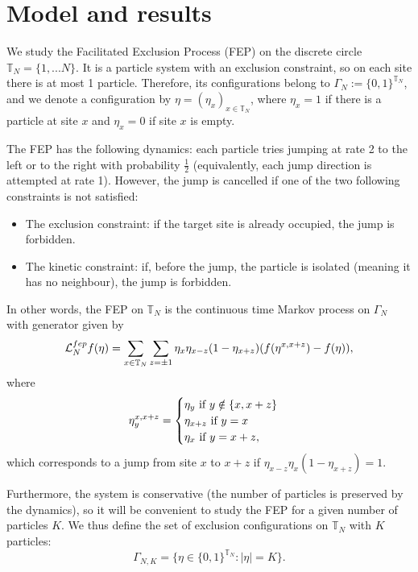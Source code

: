 \documentclass[11pt,a4paper]{article}
\newcommand{\T}{\mathbb{T}}
\newcommand{\FEP}{\textsc{fep}}
\newcommand{\eqs}[1]{\begin{equation}#1\end{equation}}
\newcommand{\eq}[2]{\begin{equation}\label{#1}#2\end{equation}}
\begin{document}
\section{Model and results}
We study the Facilitated Exclusion Process (FEP) on the discrete circle $\T_N = \{1,... N\}$. It is a particle system with an exclusion constraint, so on each site there is at most 1 particle. Therefore, its configurations belong to $\Gamma_N := \{0,1\}^{\T_N}$, and we denote a configuration by $\eta = (\eta_x)_{x \in \T_N}$, where $\eta_x = 1$ if there is a particle at site $x$ and $\eta_x=0$ if site $x$ is empty. 

The FEP has the following dynamics: each particle tries jumping at rate 2 to the left or to the right with probability $\frac12$ (equivalently, each jump direction is attempted at rate 1). However, the jump is cancelled if one of the two following constraints is not satisfied:
\begin{itemize}
\item The exclusion constraint: if the target site is already occupied, the jump is forbidden.
\item The kinetic constraint: if, before the jump, the particle is isolated (meaning it has no neighbour), the jump is forbidden.
\end{itemize}

In other words, the FEP on $\T_N$ is the continuous time Markov process on $\Gamma_{N}$ with generator given by
\eqs{\mathcal{L}_N^{\FEP}f(\eta) = \sum_{x \in \T_N}\sum_{z = \pm 1}\eta_x \eta_{x-z} (1 - \eta_{x+z}) (f(\eta^{x,x+z}) - f(\eta)),}
where
\begin{equation} \label{eq:swap-fep}
\eta_y^{x,x+z} =
    \begin{cases}
        \eta_y \hbox{ if } y \notin \{x,x+z\}\\
        \eta_{x+z} \hbox{ if } y=x \\
        \eta_x \hbox{ if } y = x+z,
    \end{cases}       
    \end{equation}
which corresponds to a jump from site $x$ to $x+z$ if $\eta_{x-z}\eta_x(1-\eta_{x+z})=1$. 

Furthermore, the system is conservative (the number of particles is preserved by the dynamics), so it will be convenient to study the FEP for a given number of particles $K$. We thus define the set of exclusion configurations on $\T_N$ with $K$ particles: 
\eq{eq:def_gammaNK}{\Gamma_{N,K} = \{\eta \in \{0,1\}^{\T_N} : |\eta| = K\}.} 
\end{document}
